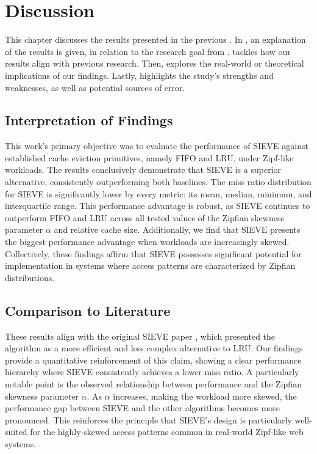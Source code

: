 \chapter{Discussion}\label{chapter:discussion}

This chapter discusses the results presented in the previous . In , an explanation of the results is given, in relation to the research goal from .  tackles how our results align with previous research. Then,  explores the real-world or theoretical implications of our findings. Lastly,  highlights the study's strengths and weaknesses, as well as potential sources of error.

\section{Interpretation of Findings}\label{discussion:interpretation}


This work's primary objective was to evaluate the performance of SIEVE against established cache eviction primitives, namely FIFO and LRU, under Zipf-like workloads. The results conclusively demonstrate that SIEVE is a superior alternative, consistently outperforming both baselines. The miss ratio distribution for SIEVE is significantly lower by every metric: its mean, median, minimum, and interquartile range. This performance advantage is robust, as SIEVE continues to outperform FIFO and LRU across all tested values of the Zipfian skewness parameter $\alpha$ and relative cache size. Additionally, we find that SIEVE presents the biggest performance advantage when workloads are increasingly skewed. Collectively, these findings affirm that SIEVE possesses significant potential for implementation in systems where access patterns are characterized by Zipfian distributions.

\section{Comparison to Literature}\label{discussion:literature}


These results align with the original SIEVE paper \cite{sieve}, which presented the algorithm as a more efficient and less complex alternative to LRU. Our findings provide a quantitative reinforcement of this claim, showing a clear performance hierarchy where SIEVE consistently achieves a lower miss ratio. A particularly notable point is the observed relationship between performance and the Zipfian skewness parameter $\alpha$. As $\alpha$ increases, making the workload more skewed, the performance gap between SIEVE and the other algorithms becomes more pronounced. This reinforces the principle that SIEVE's design is particularly well-suited for the highly-skewed access patterns common in real-world Zipf-like web systems.

